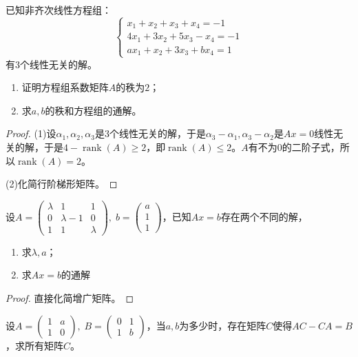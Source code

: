 \begin{theorem}
	已知非齐次线性方程组：
	\begin{equation*}
		\begin{cases}
			x_1+x_2+x_3+x_4=-1 \\
			4x_1+3x_2+5x_3-x_4=-1 \\
			ax_1+x_2+3x_3+bx_4=1
		\end{cases}
	\end{equation*}
	有$3$个线性无关的解。
	\begin{enumerate}
		\item 证明方程组系数矩阵$A$的秩为$2$；
		\item 求$a,b$的秩和方程组的通解。
	\end{enumerate}
\end{theorem}
\begin{proof}
	(1)设$\alpha_1,\alpha_2,\alpha_3$是$3$个线性无关的解，于是$\alpha_3-\alpha_1,\alpha_3-\alpha_2$是$Ax=0$线性无关的解，于是$4-\operatorname{rank}(A)\geqslant2$，即$\operatorname{rank}(A)\leqslant2$。$A$有不为$0$的二阶子式，所以$\operatorname{rank}(A)=2$。\par
	(2)化简行阶梯形矩阵。
\end{proof}
\begin{theorem}
	设$A=
	\begin{pmatrix}
		\lambda & 1 & 1 \\
		0 & \lambda-1 & 0 \\
		1 & 1 & \lambda
	\end{pmatrix},\;
	b=
	\begin{pmatrix}
		a \\
		1 \\
		1
	\end{pmatrix}$，已知$Ax=b$存在两个不同的解，
	\begin{enumerate}
		\item 求$\lambda,a$；
		\item 求$Ax=b$的通解
	\end{enumerate}
\end{theorem}
\begin{proof}
	直接化简增广矩阵。
\end{proof}
\begin{theorem}
	设$A=
	\begin{pmatrix}
		1 & a \\
		1 & 0
	\end{pmatrix},\;
	B=
	\begin{pmatrix}
		0 & 1 \\
		1 & b
	\end{pmatrix}$，当$a,b$为多少时，存在矩阵$C$使得$AC-CA=B$，求所有矩阵$C$。
\end{theorem}
